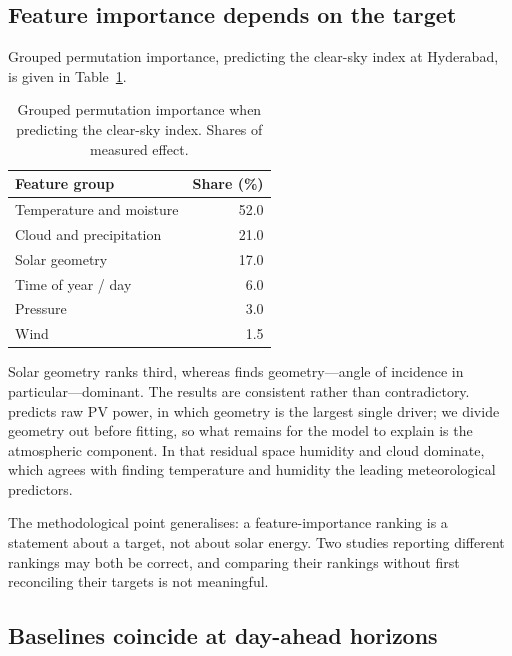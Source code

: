 \documentclass[conference]{IEEEtran}
\begin{document}
\subsection{Feature importance depends on the target}
\label{sec:f4}

Grouped permutation importance, predicting the clear-sky index at
Hyderabad, is given in Table~\ref{tab:f4}.

\begin{table}[!t]
\caption{Grouped permutation importance when predicting the clear-sky
index. Shares of measured effect.}
\label{tab:f4}
\centering
\begin{tabular}{lr}
\toprule
Feature group & Share (\%) \\
\midrule
Temperature and moisture & 52.0 \\
Cloud and precipitation  & 21.0 \\
Solar geometry           & 17.0 \\
Time of year / day       & 6.0 \\
Pressure                 & 3.0 \\
Wind                     & 1.5 \\
\bottomrule
\end{tabular}
\end{table}

Solar geometry ranks third, whereas \cite{P5} finds geometry---angle of
incidence in particular---dominant. The results are consistent rather
than contradictory. \cite{P5} predicts raw PV power, in which geometry
is the largest single driver; we divide geometry out before fitting, so
what remains for the model to explain is the atmospheric component. In
that residual space humidity and cloud dominate, which agrees with
\cite{P2} finding temperature and humidity the leading meteorological
predictors.

The methodological point generalises: a feature-importance ranking is a
statement about a target, not about solar energy. Two studies reporting
different rankings may both be correct, and comparing their rankings
without first reconciling their targets is not meaningful.

\subsection{Baselines coincide at day-ahead horizons}
\label{sec:f5}
\end{document}
